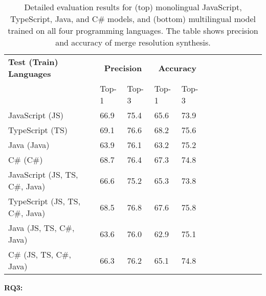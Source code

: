\begin{table}
\small
\caption{Detailed evaluation results for (top) monolingual JavaScript, TypeScript, Java, and C\# models, and (bottom) multilingual \thistool{} model trained on all four programming languages. The table shows precision and accuracy of merge resolution synthesis.}
\vspace{-4pt}
\centering
\begin{tabular}{llllllllllll} \toprule
\textbf{Test (Train) Languages} & \multicolumn{2}{c}{\textbf{Precision}} &  \multicolumn{2}{c}{\textbf{Accuracy}}  \\ \cmidrule{2-3} \cmidrule{4-5} 
& Top-1 & Top-3 & Top-1 & Top-3 \\ 
\midrule
JavaScript (JS)  & 66.9 &75.4 & 65.6& 73.9 \\ %
TypeScript (TS)  & 69.1 &76.6 & 68.2& 75.6 \\ %
Java (Java)  & 63.9 &76.1 & 63.2 &75.2 \\ %
C\# (C\#)  & 68.7 &76.4 & 67.3& 74.8 \\ %
\midrule
JavaScript (JS, TS, C\#, Java)  & 66.6& 75.2 & 65.3 &73.8 \\ %
TypeScript (JS, TS, C\#, Java)  & 68.5 &76.8 & 67.6 &75.8 \\ %
Java (JS, TS, C\#, Java)  &  63.6 &76.0 & 62.9& 75.1 \\ %
C\# (JS, TS, C\#, Java)  & 66.3 &76.2 & 65.1 &74.8 \\ %
\bottomrule
\end{tabular}
\label{tab:mergebert_summary}
\vspace{-4pt}
\end{table}

\noindent \textbf{RQ\scriptsize{3}: }\textbf{\rqThree}

